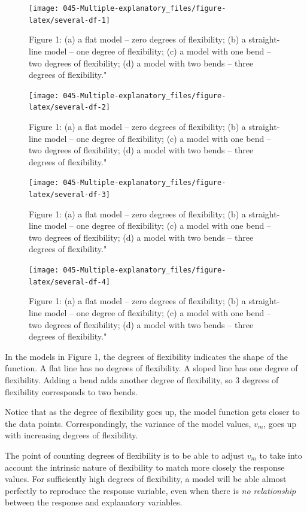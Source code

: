 \documentclass[]{book}
\begin{document}
\begin{figure}\texttt{[image: 045-Multiple-explanatory\_files/figure-latex/several-df-1]} \caption{Figure 1: (a) a flat model -- zero degrees of flexibility; (b) a straight-line model -- one degree of flexibility; (c)
a model with one bend -- two degrees of flexibility; (d) a model with two bends -- three degrees of flexibility."}\label{fig:several-df}
\end{figure}
\begin{figure}\texttt{[image: 045-Multiple-explanatory\_files/figure-latex/several-df-2]} \caption{Figure 1: (a) a flat model -- zero degrees of flexibility; (b) a straight-line model -- one degree of flexibility; (c)
a model with one bend -- two degrees of flexibility; (d) a model with two bends -- three degrees of flexibility."}\label{fig:several-df}
\end{figure}
\begin{figure}\texttt{[image: 045-Multiple-explanatory\_files/figure-latex/several-df-3]} \caption{Figure 1: (a) a flat model -- zero degrees of flexibility; (b) a straight-line model -- one degree of flexibility; (c)
a model with one bend -- two degrees of flexibility; (d) a model with two bends -- three degrees of flexibility."}\label{fig:several-df}
\end{figure}
\begin{figure}\texttt{[image: 045-Multiple-explanatory\_files/figure-latex/several-df-4]} \caption{Figure 1: (a) a flat model -- zero degrees of flexibility; (b) a straight-line model -- one degree of flexibility; (c)
a model with one bend -- two degrees of flexibility; (d) a model with two bends -- three degrees of flexibility."}\label{fig:several-df}
\end{figure}

In the models in Figure 1, the degrees of flexibility indicates the shape of the function. A flat line has no degrees of flexibility. A sloped line has one degree of flexibility. Adding a bend adds another degree of flexibility, so 3 degrees of flexibility corresponds to two bends.

Notice that as the degree of flexibility goes up, the model function gets closer to the data points. Correspondingly, the variance of the model values, \(v_m\), goes up with increasing degrees of flexibility.

The point of counting degrees of flexibility is to be able to adjust \(v_m\) to take into account the intrinsic nature of flexibility to match more closely the response values. For sufficiently high degrees of flexibility, a model will be able almost perfectly to reproduce the response variable, even when there is \emph{no relationship} between the response and explanatory variables.
\end{document}
